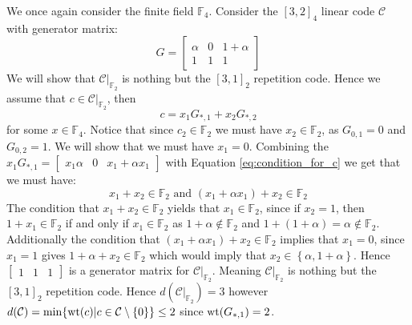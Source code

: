 \begin{example}\label{exmp:reduction_to_repr}
  We once again consider the finite field $\mathbb{F}_{4}$.  Consider the $[3, 2]_{4}$ linear code $\mathcal{C}$ with generator matrix:
  \begin{equation*}
    G = \begin{bmatrix}
          \alpha & 0 & 1 + \alpha \\
          1 & 1 & 1
        \end{bmatrix}
  \end{equation*}
  We will show that $\mathcal{C} \vert_{\mathbb{F}_2}$ is nothing but the $[3, 1]_2$ repetition code. Hence we assume that $c \in \mathcal{C} \vert_{\mathbb{F}_2}$, then
  \begin{equation}\label{eq:condition_for_c}
    c = x_1 G_{*, 1} + x_2 G_{*, 2}
  \end{equation}
  for some $x \in \mathbb{F}_4$. Notice that since $c_2 \in \mathbb{F}_2$ we must have $x_2 \in \mathbb{F}_2$, as $G_{0, 1} = 0$ and $G_{0, 2} = 1$. We will show that we must have $x_1 = 0$. Combining the $x_1 G_{*, 1} = \begin{bmatrix}
                      x_1 \alpha & 0 & x_1 + \alpha x_{1}
                   \end{bmatrix}$
  with Equation \ref{eq:condition_for_c} we get that we must have:
  \begin{equation*}
    x_1 + x_2 \in \mathbb{F}_2 \text{ and }  (x_1 + \alpha x_1) + x_2 \in \mathbb{F}_2
  \end{equation*}
  The condition that $x_1 + x_2 \in \mathbb{F}_2$ yields that $x_1 \in \mathbb{F}_2$, since if $x_2 = 1$, then $1 + x_1 \in \mathbb{F}_2$ if and only if $x_1 \in \mathbb{F}_2$ as $1 + \alpha \not \in \mathbb{F}_2$ and $1 + (1 + \alpha) = \alpha \not \in \mathbb{F}_2$. Additionally the condition that $(x_1 + \alpha x_1) + x_2 \in \mathbb{F}_2$ implies that $x_1 = 0$, since $x_{1} = 1$ gives $1 + \alpha + x_2 \in \mathbb{F}_2$ which would imply that $x_2 \in \left\{\alpha, 1 + \alpha \right\}$. Hence $\begin{bmatrix} 1 &  1 & 1 \end{bmatrix}$ is a generator matrix for  $\mathcal{C} \vert_{\mathbb{F}_2}$. Meaning $\mathcal{C} \vert_{\mathbb{F}_2}$ is nothing but the $[3, 1]_2$ repetition code. Hence $d(\mathcal{C} \vert_{\mathbb{F}_2}) = 3$ however $d(\mathcal{C}) = \min\{\mathrm{wt}(c) \vert c \in \mathcal{C} \setminus \left\{0\right\}\} \leq 2$ since $\mathrm{wt}(G_{*, 1}) = 2$.
\end{example}

